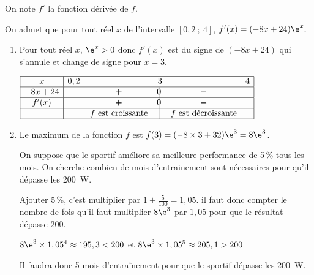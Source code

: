 On note $f'$ la fonction dérivée de $f$. 

On admet que pour tout réel $x$ de l'intervalle $[0,2~;~4]$,
$f'(x)=(-8x+24)\e^{x}.$

\begin{enumerate}
\item
Pour tout réel $x$, $\e^{x}>0$ donc $f'(x)$ est du signe de $(-8x+24)$ qui s'annule et change de signe pour $x=3$.

\begin{center}
{\renewcommand{\arraystretch}{1.3}
\def\esp{\hspace*{2.5cm}}
\def\hauteur{0pt}
$\begin{array}{|c| *4{c} c|}
\hline
 x & 0,2  & \esp & 3 & \esp & 4 \\
  \hline
-8x+24 &  &  \pmb{+} & \vline\hspace{-2.7pt}0 & \pmb{-} & \\  
 \hline
f'(x) &  &  \pmb{+} & \vline\hspace{-2.7pt}0 & \pmb{-} & \\  
\hline
 && f \text{ est croissante} & \vline\hspace{-2.7pt}{\phantom 0} & f \text{ est décroissante} & \\
\hline
\end{array}$
}
\end{center}


\item 
Le maximum de la fonction $f$ est $f(3)= (-8\times 3+32)\e^{3}=8\e^{3}$.

On suppose que le sportif améliore sa meilleure performance de 5\,\% tous les mois. On cherche combien de mois d'entrainement sont nécessaires pour qu'il dépasse les 200~W.

Ajouter 5\,\%, c'est multiplier par $1+\frac{5}{100} = 1,05$. il faut donc compter le nombre de fois qu'il faut multiplier $8\e^{3}$ par $1,05$ pour que le résultat dépasse $200$.

$8\e^{3} \times 1,05^4 \approx 195,3 < 200$ et $8\e^{3} \times 1,05^5 \approx 205,1 > 200$ 

Il faudra donc 5 mois d'entraînement pour que le sportif dépasse les 200~W.

\end{enumerate}

\vspace{0.5cm}
